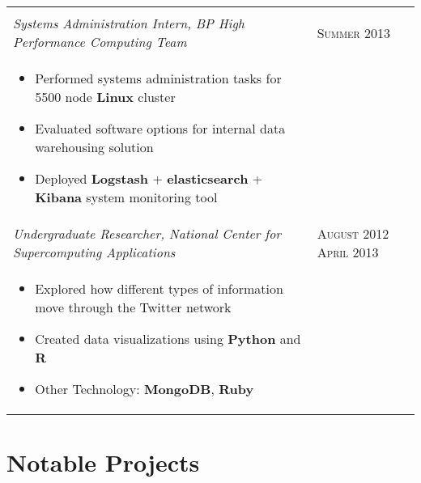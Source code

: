 \documentclass[letterpaper,10pt]{article}
\begin{document}
\begin{tabular}{p{12.8cm}>{\raggedleft\arraybackslash}p{3cm}}
\begin{itemize}
    \end{itemize} \\

    \emph{Systems Administration Intern, BP High Performance Computing Team} &
    \textsc{Summer 2013} \\

    \vspace{-2mm}
    \begin{itemize}
        \item
            Performed systems administration tasks for 5500 node \textbf{Linux} cluster
        \item
            Evaluated software options for internal data warehousing solution
        \item
            Deployed \textbf{Logstash} + \textbf{elasticsearch} +
            \textbf{Kibana} system monitoring tool
    \end{itemize} \\

    \emph{Undergraduate Researcher, National Center for Supercomputing Applications} &
    \textsc{August 2012 April 2013} \\

    \vspace{-6mm}
    \begin{itemize}
        \item
            Explored how different types of information move through the Twitter network
        \item
            Created data visualizations using \textbf{Python} and \textbf{R}
        \item
            Other Technology: \textbf{MongoDB}, \textbf{Ruby}
    \end{itemize}
\end{tabular}

\section{Notable Projects}
\end{document}

